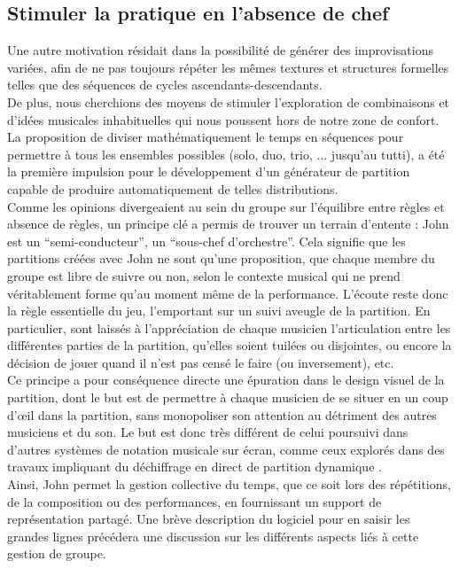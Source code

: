 \subsection{Stimuler la pratique en l'absence de chef}

\noindent Une autre motivation résidait dans la possibilité de générer des improvisations variées, afin de ne pas toujours répéter les mêmes textures et structures formelles telles que des séquences de cycles ascendants-descendants.\\
\indent De plus, nous cherchions des moyens de stimuler l'exploration de combinaisons et d'idées musicales inhabituelles qui nous poussent hors de notre zone de confort. La proposition de diviser mathématiquement le temps en séquences pour permettre à tous les ensembles possibles (solo, duo, trio, ... jusqu'au tutti), a été la première impulsion pour le développement d'un générateur de partition capable de produire automatiquement de telles distributions.\\
\indent Comme les opinions divergeaient au sein du groupe sur l'équilibre entre règles et absence de règles, un principe clé a permis de trouver un terrain d'entente : John est un ``semi-conducteur'', un ``sous-chef d'orchestre''. Cela signifie que les partitions créées avec John ne sont qu'une proposition, que chaque membre du groupe est libre de suivre ou non, selon le contexte musical qui ne prend véritablement forme qu'au moment même de la performance. L'écoute reste donc la règle essentielle du jeu, l'emportant sur un suivi aveugle de la partition. En particulier, sont laissés à l'appréciation de chaque musicien l'articulation entre les différentes parties de la partition, qu'elles soient tuilées ou disjointes, ou encore la décision de jouer quand il n'est pas censé le faire (ou inversement), etc.\\
\indent Ce principe a pour conséquence directe une épuration dans le design visuel de la partition, dont le but est de permettre à chaque musicien de se situer en un coup d'œil dans la partition, sans monopoliser son attention au détriment des autres musiciens et du son. Le but est donc très différent de celui poursuivi dans d'autres systèmes de notation musicale sur écran, comme ceux explorés dans des travaux impliquant du déchiffrage en direct de partition dynamique \cite{freeman_extreme_2008}.\\

\indent Ainsi, John permet la gestion collective du temps, que ce soit lors des répétitions, de la composition ou des performances, en fournissant un support de représentation partagé. Une brève description du logiciel pour en saisir les grandes lignes précédera une discussion sur les différents aspects liés à cette gestion de groupe.

